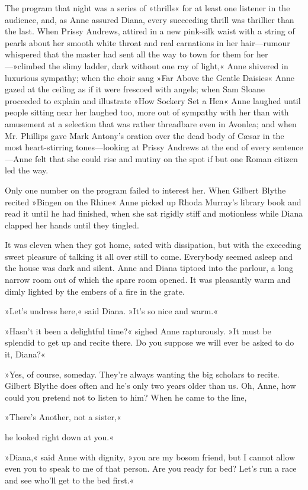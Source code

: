 The program that night was a series of »thrills« for at least one listener in the audience, and, as Anne assured Diana, every succeeding thrill was thrillier than the last. When Prissy Andrews, attired in a new pink-silk waist with a string of pearls about her smooth white throat and real carnations in her hair—rumour whispered that the master had sent all the way to town for them for her—»climbed the slimy ladder, dark without one ray of light,« Anne shivered in luxurious sympathy; when the choir sang »Far Above the Gentle Daisies« Anne gazed at the ceiling as if it were frescoed with angels; when Sam Sloane proceeded to explain and illustrate »How Sockery Set a Hen« Anne laughed until people sitting near her laughed too, more out of sympathy with her than with amusement at a selection that was rather threadbare even in Avonlea; and when Mr. Phillips gave Mark Antony's oration over the dead body of Cæsar in the most heart-stirring tones—looking at Prissy Andrews at the end of every sentence—Anne felt that she could rise and mutiny on the spot if but one Roman citizen led the way.

Only one number on the program failed to interest her. When Gilbert Blythe recited »Bingen on the Rhine« Anne picked up Rhoda Murray's library book and read it until he had finished, when she sat rigidly stiff and motionless while Diana clapped her hands until they tingled.

It was eleven when they got home, sated with dissipation, but with the exceeding sweet pleasure of talking it all over still to come. Everybody seemed asleep and the house was dark and silent. Anne and Diana tiptoed into the parlour, a long narrow room out of which the spare room opened. It was pleasantly warm and dimly lighted by the embers of a fire in the grate.

»Let's undress here,« said Diana. »It's so nice and warm.«

»Hasn't it been a delightful time?« sighed Anne rapturously. »It must be splendid to get up and recite there. Do you suppose we will ever be asked to do it, Diana?«

»Yes, of course, someday. They're always wanting the big scholars to recite. Gilbert Blythe does often and he's only two years older than us. Oh, Anne, how could you pretend not to listen to him? When he came to the line,

»There's Another, not a sister,«

he looked right down at you.«

»Diana,« said Anne with dignity, »you are my bosom friend, but I cannot allow even you to speak to me of that person. Are you ready for bed? Let's run a race and see who'll get to the bed first.«

